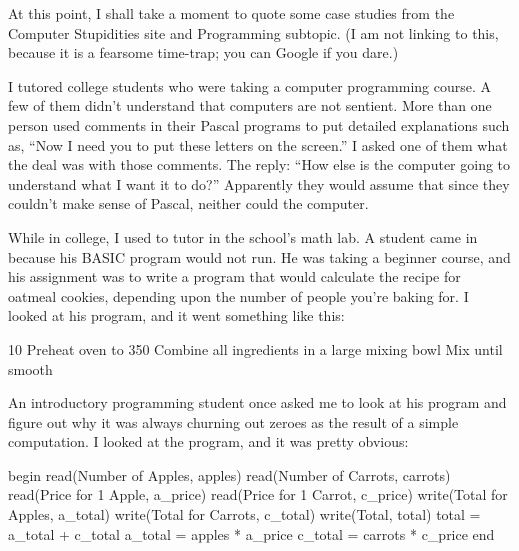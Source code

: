 {
 At this point, I shall take a moment to quote some case studies
from the Computer Stupidities site and Programming subtopic. (I am not
linking to this, because it is a fearsome time-trap; you can Google if
you dare.)}

{
 I tutored college students who were taking a computer programming
course. A few of them didn't understand that computers
are not sentient. More than one person used comments in their Pascal
programs to put detailed explanations such as, ``Now I
need you to put these letters on the screen.'' I
asked one of them what the deal was with those comments. The reply:
``How else is the computer going to understand what I
want it to do?'' Apparently they would assume that
since they couldn't make sense of Pascal, neither could
the computer.}

{
 While in college, I used to tutor in the school's
math lab. A student came in because his BASIC program would not run. He
was taking a beginner course, and his assignment was to write a program
that would calculate the recipe for oatmeal cookies, depending upon the
number of people you're baking for. I looked at his
program, and it went something like this:}

{
 10 Preheat oven to 350 Combine all ingredients in a large mixing bowl Mix until smooth}

{
 An introductory programming student once asked me to look at his
program and figure out why it was always churning out zeroes as the
result of a simple computation. I looked at the program, and it was
pretty obvious:}

{
 begin\newline
 read({\textquotedbl}Number of Apples{\textquotedbl}, apples)\newline
 read({\textquotedbl}Number of Carrots{\textquotedbl}, carrots)\newline
 read({\textquotedbl}Price for 1 Apple{\textquotedbl}, a\_price)\newline
 read({\textquotedbl}Price for 1 Carrot{\textquotedbl},
c\_price)\newline
 write({\textquotedbl}Total for Apples{\textquotedbl}, a\_total)\newline
 write({\textquotedbl}Total for Carrots{\textquotedbl},
c\_total)\newline
 write({\textquotedbl}Total{\textquotedbl}, total)\newline
 total = a\_total + c\_total\newline
 a\_total = apples * a\_price\newline
 c\_total = carrots * c\_price\newline
 end\newline
}

